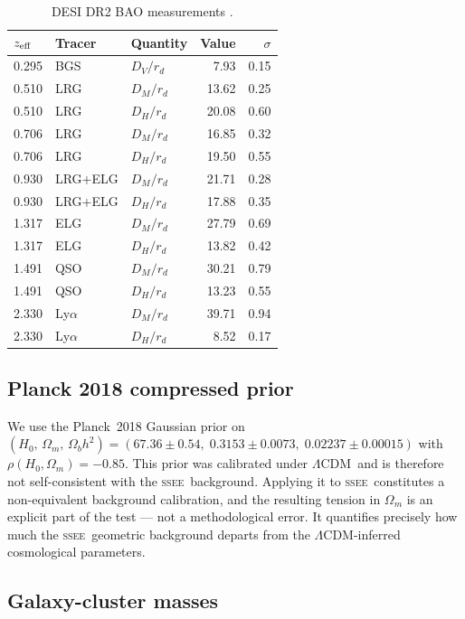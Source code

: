 \documentclass[12pt,a4paper]{article}
\newcommand{\SSEE}{\ifmmode\mathrm{SSEE}\else\textsc{ssee}\fi}
\newcommand{\LCDM}{\ifmmode\Lambda\mathrm{CDM}\else$\Lambda$CDM\fi}
\begin{document}
\begin{table}[H]
\centering
\caption{DESI DR2 BAO measurements \citep{DESI_DR2}.}
\label{tab:bao_data}
\small
\begin{tabular}{lllrr}
\toprule
$z_{\rm eff}$ & Tracer & Quantity & Value & $\sigma$ \\
\midrule
0.295 & BGS        & $D_V/r_d$  &  7.93 & 0.15 \\
0.510 & LRG        & $D_M/r_d$  & 13.62 & 0.25 \\
0.510 & LRG        & $D_H/r_d$  & 20.08 & 0.60 \\
0.706 & LRG        & $D_M/r_d$  & 16.85 & 0.32 \\
0.706 & LRG        & $D_H/r_d$  & 19.50 & 0.55 \\
0.930 & LRG+ELG    & $D_M/r_d$  & 21.71 & 0.28 \\
0.930 & LRG+ELG    & $D_H/r_d$  & 17.88 & 0.35 \\
1.317 & ELG        & $D_M/r_d$  & 27.79 & 0.69 \\
1.317 & ELG        & $D_H/r_d$  & 13.82 & 0.42 \\
1.491 & QSO        & $D_M/r_d$  & 30.21 & 0.79 \\
1.491 & QSO        & $D_H/r_d$  & 13.23 & 0.55 \\
2.330 & Ly$\alpha$ & $D_M/r_d$  & 39.71 & 0.94 \\
2.330 & Ly$\alpha$ & $D_H/r_d$  &  8.52 & 0.17 \\
\bottomrule
\end{tabular}
\end{table}

\subsection{Planck 2018 compressed prior}

We use the Planck~2018 \citep{Planck2018} Gaussian prior on
$(H_0,\,\Omega_m,\,\Omega_b h^2)=(67.36\pm0.54,\;0.3153\pm0.0073,\;0.02237\pm0.00015)$
with $\rho(H_0,\Omega_m)=-0.85$. This prior was calibrated under
\LCDM\ and is therefore not self-consistent with the \SSEE\ background.
Applying it to \SSEE\ constitutes a non-equivalent background
calibration, and the resulting tension in $\Omega_m$ is an explicit part
of the test — not a methodological error. It quantifies precisely how
much the \SSEE\ geometric background departs from the \LCDM-inferred
cosmological parameters.

\subsection{Galaxy-cluster masses}
\end{document}
